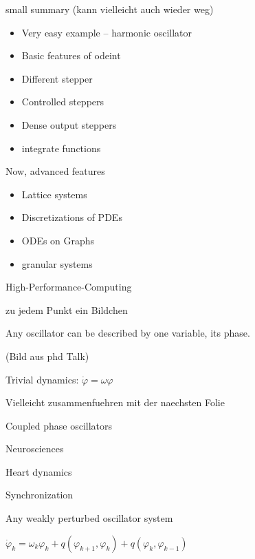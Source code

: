 \begin{frame}
 small summary (kann vielleicht auch wieder weg)
 \begin{itemize}
  \item Very easy example -- harmonic oscillator
  \item Basic features of odeint
  \item Different stepper
  \item Controlled steppers
  \item Dense output steppers
  \item integrate functions
 \end{itemize}

 Now, advanced features

\end{frame}



\begin{frame}

 \begin{itemize}
  \item<1->Lattice systems
  \item<2->Discretizations of PDEs
  \item<3->ODEs on Graphs
  \item<4->granular systems
 \end{itemize}

 High-Performance-Computing

 zu jedem Punkt ein Bildchen
 
\end{frame}



\begin{frame}[fragile]

 Any oscillator can be described by one variable, its phase.

 (Bild aus phd Talk)

 Trivial dynamics: $\dot{\varphi}=\omega \varphi$

Vielleicht zusammenfuehren mit der naechsten Folie

\end{frame}




\begin{frame}

 Coupled phase oscillators

 Neurosciences

 Heart dynamics

 Synchronization

 Any weakly perturbed oscillator system

 $\dot{\varphi}_k = \omega_k \varphi_k + q( \varphi_{k+1} , \varphi_k ) + q( \varphi_k , \varphi_{k-1} )$

\end{frame}




